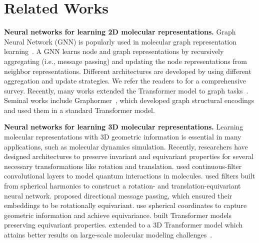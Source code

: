 \documentclass{article} \usepackage[dvipsnames]{xcolor}
\begin{document}
\section{Related Works}
\vspace{-8pt}
\label{sec-related}
\textbf{Neural networks for learning 2D molecular representations. }
Graph Neural Network (GNN) is popularly used in molecular graph representation learning~\citep{kipf2016semi,hamilton2017inductive,gilmer2017neural,xu2018how,velivckovic2018graph}. A GNN learns node and graph representations by recursively aggregating (i.e., message passing) and updating the node representations from neighbor representations. Different architectures are developed by using different aggregation and update strategies. We refer the readers to \citet{wu2020comprehensive} for a comprehensive survey. Recently, many works extended the Transformer model to graph tasks~\citep{dwivedi2020generalization,kreuzer2021rethinking,ying2021transformers,luo2022your,kim2022pure,rampavsek2022recipe,park2022grpe,hussain2022global,zhang2023rethinking}. Seminal works include Graphormer~\citep{ying2021transformers}, which developed graph structural encodings and used them in a standard Transformer model.

\textbf{Neural networks for learning 3D molecular representations. }
Learning molecular representations with 3D geometric information is essential in many applications, such as molecular dynamics simulation. Recently, researchers have designed architectures to preserve invariant and equivariant properties for several necessary transformations like rotation and translation. \citet{schutt2017schnet} used continuous-filter convolutional layers to  model quantum interactions in molecules. \citet{thomas2018tensor} used filters built from spherical harmonics to construct a rotation- and translation-equivariant neural network. \citet{klicpera2020directional} proposed directional message passing, which ensured their embeddings to be rotationally equivariant. \citet{liu2022spherical,wang2022comenet} use spherical coordinates to capture geometric information and achieve equivariance. \citet{hutchinson2021lietransformer, tholke2021equivariant} built Transformer models preserving equivariant properties. \cite{shi2022benchmarking} extended \cite{ying2021transformers} to a 3D Transformer model which attains better results on large-scale molecular modeling challenges~\citep{chanussot2020open}. 
\end{document}
